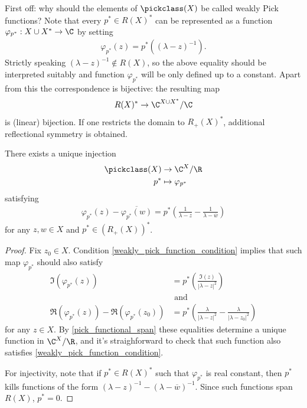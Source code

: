 First off: why should the elements of $\pickclass(X)$ be called weakly Pick functions? Note that every $p^{*} \in R(X)^{*}$ can be represented as a function $\varphi_{p^{*}} : X \cup X^{*} \to \C$ by setting
\begin{align*}
	\varphi_{p^{*}}(z) = p^{*}((\lambda - z)^{-1}).
\end{align*}
Strictly speaking $(\lambda - z)^{-1} \notin R(X)$, so the above equality should be interpreted suitably and function $\varphi_{p^{*}}$ will be only defined up to a constant. Apart from this the correspondence is bijective: the resulting map
\begin{align*}
	R(X)^{*} \to \C^{X \cup X^{*}}/\C
\end{align*}
is (linear) bijection. If one restricts the domain to $R_{+}(X)^{*}$, additional reflectional symmetry is obtained.
\begin{lem}\label{weakly_pick_nonsense}
	There exists a unique injection
	\begin{align*}
		\pickclass(X) &\to \C^{X}/\R \\
		p^{*} &\mapsto \varphi_{p^{*}}
	\end{align*}
	satisfying
	\begin{align}\label{weakly_pick_function_condition}
		\varphi_{p^{*}}(z) - \overline{\varphi_{p^{*}}(w)} = p^{*}\left(\frac{1}{\lambda - z} -\frac{1}{\lambda - \overline{w}}\right)
	\end{align}
	for any $z, w \in X$ and $p^{*} \in (R_{+}(X))^{*}$.
\end{lem}
\begin{proof}
	Fix $z_{0} \in X$. Condition \ref{weakly_pick_function_condition} implies that such map $\varphi_{p^{*}}$ should also satisfy
	\begin{align}\label{weakly_pick_condition_2}
		\Im(\varphi_{p^{*}}(z)) &= p^{*}\left(\frac{\Im(z)}{|\lambda - z|^{2}}\right) \nonumber\\
		&\text{ and } \\
		\Re(\varphi_{p^{*}}(z)) - \Re(\varphi_{p^{*}}(z_{0})) &= p^{*}\left(\frac{\lambda}{|\lambda - z|^2} - \frac{\lambda}{|\lambda - z_{0}|^2}\right) \nonumber
	\end{align}
	for any $z \in X$. By \ref{pick_functional_span} these equalities determine a unique function in $\C^{X}/\R$, and it's straighforward to check that such function also satisfies \ref{weakly_pick_function_condition}.

	For injectivity, note that if $p^{*} \in R(X)^{*}$ such that $\varphi_{p^{*}}$ is real constant, then $p^{*}$ kills functions of the form $(\lambda - z)^{-1} -(\lambda - \overline{w})^{-1}$. Since such functions span $R(X)$, $p^{*} = 0$. 
\end{proof}

